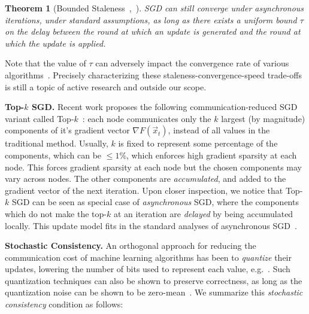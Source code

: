 \documentclass[11pt]{article}
\renewcommand{\paragraph}[1]{\vspace{0.1em} \noindent \textbf{#1}}
\newtheorem{theorem}{Theorem}[section]
\begin{document}
\begin{theorem}[Bounded Staleness~\cite{recht2011hogwild},~\cite{liu2015asynchronous}]
	SGD can still converge under asynchronous
	iterations, under standard assumptions, as long as there exists a uniform bound $\tau$  on the delay
	between the round at which an update is generated and the round at
	which the update is applied. 
\end{theorem}

Note that the value of $\tau$ can adversely impact the convergence rate of
various algorithms~\cite{recht2011hogwild, liu2015asynchronous,
	jiang2017}.  Precisely characterizing these staleness-convergence-speed
trade-offs is still a topic of active research and outside our scope. 

\paragraph{Top-$k$ SGD.} Recent work proposes the following communication-reduced SGD variant
called Top-$k$~\cite{dryden2016communication,
	aji2017sparse}: each node communicates only the $k$ largest (by
magnitude) components of it's gradient vector $\nabla F(\vec{x}_t)$,
instead of all values in the traditional method. 
%
Usually, $k$ is fixed to represent some percentage of the components,
which can be  $\leq 1\%$, which enforces high gradient sparsity at each node.
%
This forces gradient sparsity at each node but the chosen components may
vary across nodes. The other components are \emph{accumulated}, and added to the gradient vector of the next iteration. 
Upon closer inspection, we notice that Top-$k$ SGD can be seen as
special case of \emph{asynchronous} SGD, where the components which do
not make the top-$k$ at an iteration are \emph{delayed} by being
accumulated locally.
This update model fits in the standard
analyses of asynchronous SGD~\cite{recht2011hogwild}.

\paragraph{Stochastic Consistency.} An orthogonal approach for reducing
the communication cost of machine learning algorithms has been to
\emph{quantize} their updates, lowering the number of bits used to
represent each value, e.g.~\cite{seide20141, de2015taming, alistarh2016qsgd, terngrad}. 
Such quantization techniques can also be shown to preserve correctness, as
long as the quantization noise can be shown to be zero-mean~\cite{alistarh2016qsgd}. 
We summarize this \emph{stochastic consistency} condition as follows: 
\end{document}
